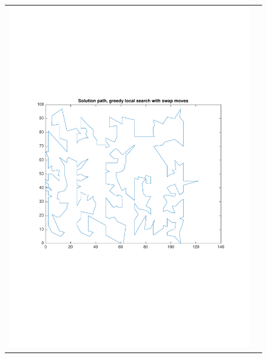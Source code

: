\documentclass[a4paper, 11pt]{scrartcl}
\begin{document}
\begin{figure}[!ht]
  \centering
  \begin{tabular}{cc}
    \includegraphics[scale=0.4, trim={3cm 6cm 1cm 6cm}]{../figures/solutionPath_swap.pdf} & 

\end{tabular}
\end{figure}
\end{document}
